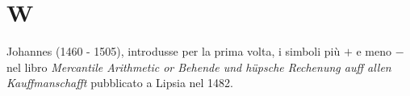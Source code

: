 \chapter{W}
\vspace{5mm} 
Johannes (1460 - 1505), introdusse per la prima volta, i simboli più $+$ e meno $-$ nel libro \foreignlanguage{german}{\textit{Mercantile Arithmetic or Behende und hüpsche Rechenung auff allen Kauffmanschafft}} pubblicato a Lipsia nel 1482.
